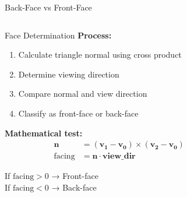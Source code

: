 \begin{frame}{Back-Face vs Front-Face}
  \begin{columns}
    \footnotesize
    \begin{column}{0.7\textwidth}
      \begin{raybox}{Face Determination}
        \textbf{Process:}
        \begin{enumerate}
          \item Calculate triangle normal using cross product
          \item Determine viewing direction
          \item Compare normal and view direction
          \item Classify as front-face or back-face
        \end{enumerate}

        \vspace{0.3cm}
        \textbf{Mathematical test:}
        \begin{align*}
          \mathbf{n} &= (\mathbf{v_1} - \mathbf{v_0}) \times (\mathbf{v_2} - \mathbf{v_0}) \\
          \text{facing} &= \mathbf{n} \cdot \mathbf{view\_dir}
        \end{align*}

        If $\text{facing} > 0$ → Front-face \\
        If $\text{facing} < 0$ → Back-face
      \end{raybox}
    \end{column}
    \begin{column}{0.3\textwidth}
\end{column}
\end{columns}
\end{frame}
